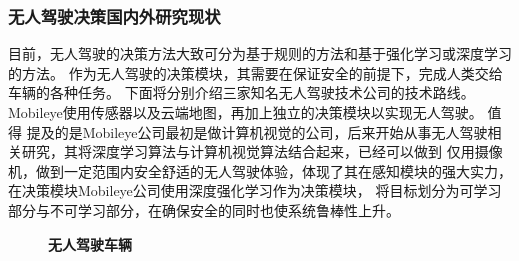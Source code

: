 \subsubsection{无人驾驶决策国内外研究现状}
目前，无人驾驶的决策方法大致可分为基于规则的方法和基于强化学习或深度学习的方法。
作为无人驾驶的决策模块，其需要在保证安全的前提下，完成人类交给车辆的各种任务。
下面将分别介绍三家知名无人驾驶技术公司的技术路线。
Mobileye使用传感器以及云端地图，再加上独立的决策模块以实现无人驾驶。
值得
提及的是Mobileye公司最初是做计算机视觉的公司，后来开始从事无人驾驶相关研究，其将深度学习算法与计算机视觉算法结合起来，已经可以做到
仅用摄像机，做到一定范围内安全舒适的无人驾驶体验，体现了其在感知模块的强大实力，在决策模块Mobileye公司使用深度强化学习作为决策模块，
将目标划分为可学习部分与不可学习部分，在确保安全的同时也使系统鲁棒性上升。
\begin{figure}[htbp]
\centering
{}%
%
%
\centering
\caption{ \textbf{无人驾驶车辆}}
\end{figure}

